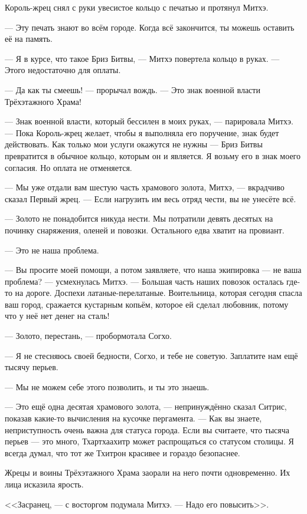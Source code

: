 Король-жрец снял с руки увесистое кольцо с печатью и протянул Митхэ.

--- Эту печать знают во всём городе.
Когда всё закончится, ты можешь оставить её на память.

--- Я в курсе, что такое Бриз Битвы, --- Митхэ повертела кольцо в руках.
--- Этого недостаточно для оплаты.

--- Да как ты смеешь! --- прорычал вождь.
--- Это знак военной власти Трёхэтажного Храма!

--- Знак военной власти, который бессилен в моих руках, --- парировала Митхэ.
--- Пока Король-жрец желает, чтобы я выполняла его поручение, знак будет действовать.
Как только мои услуги окажутся не нужны --- Бриз Битвы превратится в обычное кольцо, которым он и является.
Я возьму его в знак моего согласия.
Но оплата не отменяется.

--- Мы уже отдали вам шестую часть храмового золота, Митхэ, --- вкрадчиво сказал Первый жрец.
--- Если нагрузить им весь отряд чести, вы не унесёте всё.

--- Золото не понадобится никуда нести.
Мы потратили девять десятых на починку снаряжения, оленей и повозки.
Остального едва хватит на провиант.

--- Это не наша проблема.

--- Вы просите моей помощи, а потом заявляете, что наша экипировка --- не ваша проблема? --- усмехнулась Митхэ.
--- Большая часть наших повозок осталась где-то на дороге.
Доспехи латаные-перелатаные.
Воительница, которая сегодня спасла ваш город, сражается кустарным копьём, которое ей сделал любовник, потому что у неё нет денег на сталь!

--- Золото, перестань, --- пробормотала Согхо.

--- Я не стесняюсь своей бедности, Согхо, и тебе не советую.
Заплатите нам ещё тысячу перьев.

--- Мы не можем себе этого позволить, и ты это знаешь.

--- Это ещё одна десятая храмового золота, --- непринуждённо сказал Ситрис, показав какие-то вычисления на кусочке пергамента.
--- Как вы знаете, неприступность очень важна для статуса города.
Если вы считаете, что тысяча перьев --- это много, Тхартхаахитр может распрощаться со статусом столицы.
Я всегда думал, что тот же Тхитрон красивее и гораздо безопаснее.

Жрецы и воины Трёхэтажного Храма заорали на него почти одновременно.
Их лица исказила ярость.

<<Засранец, --- с восторгом подумала Митхэ.
--- Надо его повысить>>.

